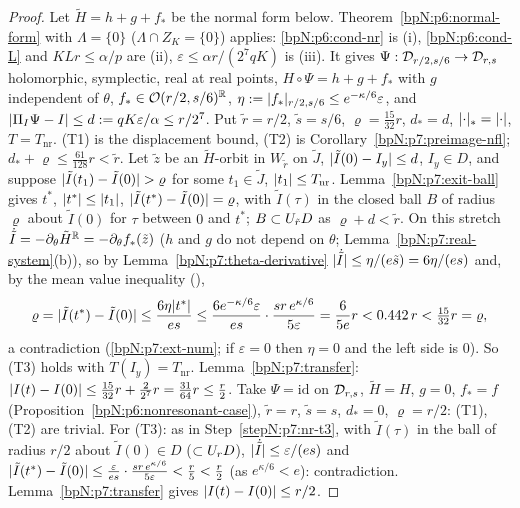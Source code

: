 \begin{proof}
Let $\tilde H=h+g+f_*$ be the normal form below.
\label{stepN:p7:nr-dataA} Theorem~\ref{bpN:p6:normal-form} with $\Lambda=\{0\}$ ($\Lambda\cap Z_K=\{0\}$) applies: \ref{bpN:p6:cond-nr} is (i), \ref{bpN:p6:cond-L} and $KLr\le\alpha/p$ are (ii), $\varepsilon\le\alpha r/(2^7qK)$ is (iii). It gives $\Psi:\mathcal D_{r/2,s/6}\to\mathcal D_{r,s}$ holomorphic, symplectic, real at real points, $H\circ\Psi=h+g+f_*$ with $g$ independent of $\theta$, $f_*\in\mathcal O(r/2,s/6)^{\mathbb{R}}$, $\eta:=\lvert f_*\rvert_{r/2,s/6}\le e^{-\kappa/6}\varepsilon$, and $\lvert \Pi_I\Psi-I\rvert\le d:=qK\varepsilon/\alpha\le r/2^7$. Put $\tilde r=r/2$, $\tilde s=s/6$, $\varrho=\frac{15}{32}r$, $d_*=d$, $\lvert \cdot\rvert_*=\lvert \cdot\rvert$, $T=T_{\mathrm{nr}}$. (T1) is the displacement bound, (T2) is Corollary~\ref{bpN:p7:preimage-nfl}; $d_*+\varrho\le\frac{61}{128}r<\tilde r$.
\label{stepN:p7:nr-t3} Let $\tilde z$ be an $\tilde H$-orbit in $W_{\tilde r}$ on $\tilde J$, $\lvert \tilde I(0)-I_y\rvert\le d$, $I_y\in D$, and suppose $\lvert \tilde I(t_1)-\tilde I(0)\rvert>\varrho$ for some $t_1\in\tilde J$, $\lvert t_1\rvert\le T_{\mathrm{nr}}$. Lemma~\ref{bpN:p7:exit-ball} gives $t^*$, $\lvert t^*\rvert\le\lvert t_1\rvert$, $\lvert \tilde I(t^*)-\tilde I(0)\rvert=\varrho$, with $\tilde I(\tau)$ in the closed ball $B$ of radius $\varrho$ about $\tilde I(0)$ for $\tau$ between $0$ and $t^*$; $B\subset U_{\tilde r}D$ as $\varrho+d<\tilde r$. On this stretch $\dot{\tilde I}=-\partial_\theta\tilde H^{\mathbb{R}}=-\partial_\theta f_*(\tilde z)$ ($h$ and $g$ do not depend on $\theta$; Lemma~\ref{bpN:p7:real-system}(b)), so by Lemma~\ref{bpN:p7:theta-derivative} $\lvert \dot{\tilde I}\rvert\le\eta/(e\tilde s)=6\eta/(es)$ and, by the mean value inequality (),
\[\varrho=\lvert \tilde I(t^*)-\tilde I(0)\rvert\le\frac{6\eta\lvert t^*\rvert}{es}\le\frac{6e^{-\kappa/6}\varepsilon}{es}\cdot\frac{sr\,e^{\kappa/6}}{5\varepsilon}=\frac{6}{5e}r<0.442\,r<\tfrac{15}{32}r=\varrho,\]
a contradiction (\ref{bpN:p7:ext-num}; if $\varepsilon=0$ then $\eta=0$ and the left side is $0$). So (T3) holds with $T(I_y)=T_{\mathrm{nr}}$.
\label{stepN:p7:nr-concA} Lemma~\ref{bpN:p7:transfer}: $\lvert I(t)-I(0)\rvert\le\frac{15}{32}r+\frac2{2^7}r=\frac{31}{64}r\le\frac r2$.
\label{stepN:p7:nr-caseB} Take $\Psi=\mathrm{id}$ on $\mathcal D_{r,s}$, $\tilde H=H$, $g=0$, $f_*=f$ (Proposition~\ref{bpN:p6:nonresonant-case}), $\tilde r=r$, $\tilde s=s$, $d_*=0$, $\varrho=r/2$: (T1), (T2) are trivial. For (T3): as in Step~\ref{stepN:p7:nr-t3}, with $\tilde I(\tau)$ in the ball of radius $r/2$ about $\tilde I(0)\in D$ ($\subset U_{r}D$), $\lvert \dot{\tilde I}\rvert\le\varepsilon/(es)$ and $\lvert \tilde I(t^*)-\tilde I(0)\rvert\le\frac{\varepsilon}{es}\cdot\frac{sr\,e^{\kappa/6}}{5\varepsilon}<\frac r5<\frac r2$ (as $e^{\kappa/6}<e$): contradiction. Lemma~\ref{bpN:p7:transfer} gives $\lvert I(t)-I(0)\rvert\le r/2$.
\end{proof}

